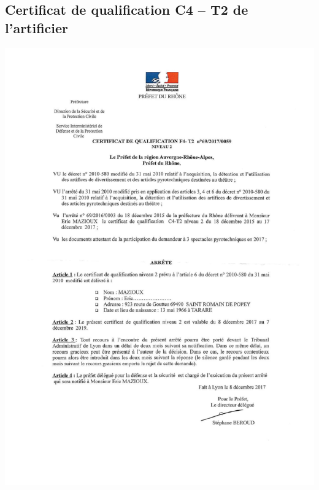 \documentclass[hidelinks, paper=a4, fontsize=13pt]{report}
\begin{document}
\subsection{Certificat de qualification C4 – T2 de l’artificier}
\begin{center}
\includegraphics[scale=0.85]{Annexes/Documents/CertificatArtifice2}
\end{center}
\end{document}
